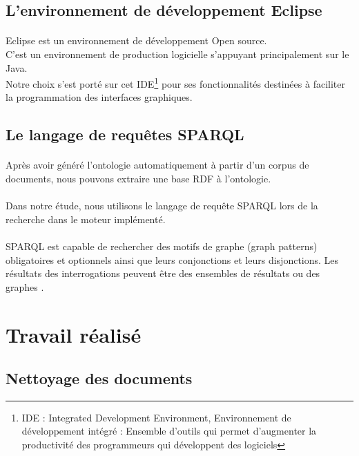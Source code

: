 \documentclass[12pt, a4paper, oneside]{book}
\begin{document}
\subsection{L'environnement de développement Eclipse}
\paragraph{}
Eclipse est un environnement de développement Open source.\\
C'est un environnement de production logicielle s'appuyant principalement sur le Java.\\
Notre choix s'est porté sur cet IDE\footnote{IDE : Integrated Development Environment, Environnement de développement intégré : Ensemble d'outils qui permet d'augmenter la productivité des programmeurs qui développent des logiciels} pour ses fonctionnalités destinées à faciliter la programmation des interfaces graphiques.

\subsection{Le langage de requêtes SPARQL}
\paragraph{}
Après avoir généré l'ontologie automatiquement à partir d'un corpus de documents, nous pouvons extraire une base RDF à l'ontologie.
\paragraph{}
Dans notre étude, nous utilisons le langage de requête SPARQL lors de la recherche dans le moteur implémenté.
\paragraph{}
SPARQL est capable de rechercher des motifs de graphe (graph patterns) obligatoires et optionnels ainsi que leurs conjonctions et leurs disjonctions.
Les résultats des interrogations peuvent être des ensembles de résultats ou des graphes \citep{sparql}.



\section{Travail réalisé}

\subsection{Nettoyage des documents}
\end{document}
